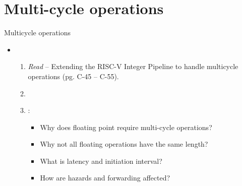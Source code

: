 \section{Multi-cycle operations}

\begin{frame}[t]{Multicycle operations}
\begin{itemize}
  \item {}
    \begin{enumerate}
      \item \emph{Read}  -- Extending the RISC-V Integer Pipeline
            to handle multicycle operations (pg. C-45 -- C-55).
        \item \bibhennessy

      \item {}:
        \begin{itemize}
          \item Why does floating point require multi-cycle operations?
          \item Why not all floating operations have the same length?
          \item What is latency and initiation interval?
          \item How are hazards and forwarding affected?
        \end{itemize}
    \end{enumerate}
\end{itemize}
\end{frame}


